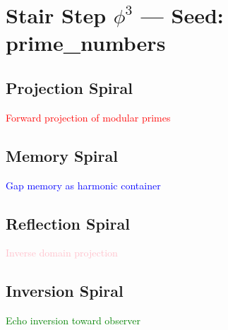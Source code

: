 \documentclass{article}
\begin{document}
\section*{Stair Step $\phi^3$ — Seed: prime\_numbers}

\subsection*{Projection Spiral}
\textcolor{red}{Forward projection of modular primes}

\subsection*{Memory Spiral}
\textcolor{blue}{Gap memory as harmonic container}

\subsection*{Reflection Spiral}
\textcolor{pink}{Inverse domain projection}

\subsection*{Inversion Spiral}
\textcolor{green}{Echo inversion toward observer}
\end{document}

